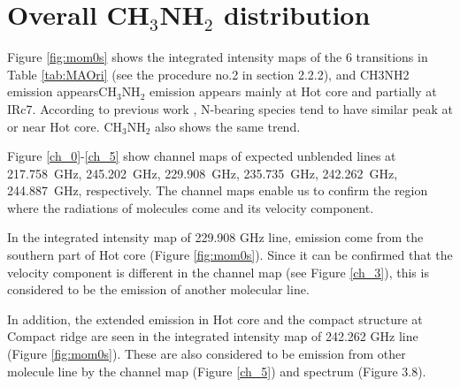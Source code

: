 \newpage
\section{Overall CH$_3$NH$_2$ distribution}
Figure \ref{fig:mom0s} shows the integrated intensity maps of the 6 transitions in Table \ref{tab:MAOri} (see the procedure no.2 in section 2.2.2), and CH3NH2 emission appearsCH$_3$NH$_2$ emission appears mainly at Hot core and partially at IRc7.
According to previous work \citep[see e.g.,][]{Feng+2015, Gong+2015}, N-bearing species tend to have 
similar peak at or near Hot core.  CH$_3$NH$_2$ also shows the same trend.

Figure \ref{ch_0}-\ref{ch_5} show channel maps of expected unblended lines at 217.758~GHz, 
245.202~GHz, 229.908~GHz, 235.735~GHz, 242.262~GHz, 244.887~GHz, respectively.
The channel maps enable us to confirm the region where the radiations of molecules come and its velocity component.

In the integrated intensity map of 229.908 GHz line, emission come from the southern part of Hot core (Figure \ref{fig:mom0s}).
Since it can be confirmed that the velocity component is different in the channel map (see Figure \ref{ch_3}), 
this is considered to be the emission of another molecular line.

In addition, the extended emission in Hot core and the compact structure at Compact ridge are seen 
in the integrated intensity map of 242.262 GHz line (Figure \ref{fig:mom0s}). 
These are also considered to be emission from other molecule line 
by the channel map (Figure \ref{ch_5}) and spectrum (Figure 3.8).

